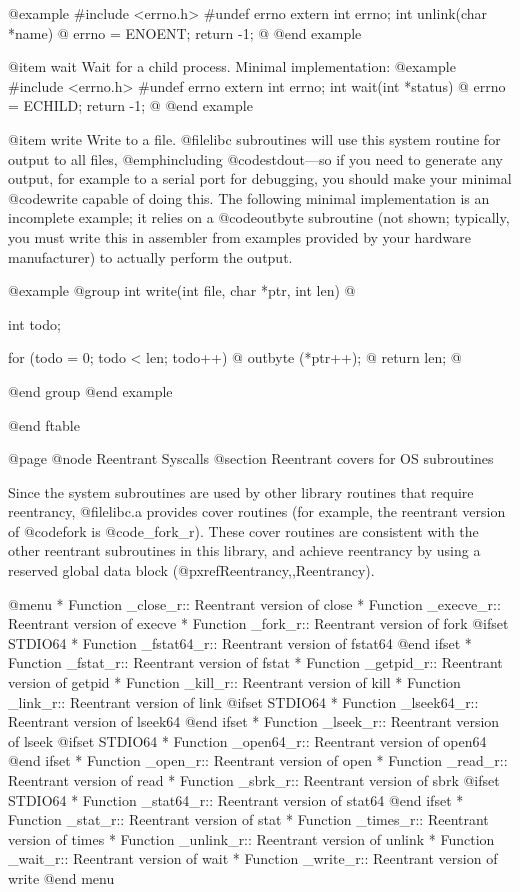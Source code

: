 @example
#include <errno.h>
#undef errno
extern int errno;
int unlink(char *name) @{
  errno = ENOENT;
  return -1; 
@}
@end example

@item wait
Wait for a child process.  Minimal implementation:
@example
#include <errno.h>
#undef errno
extern int errno;
int wait(int *status) @{
  errno = ECHILD;
  return -1;
@}
@end example

@item write
Write to a file.  @file{libc} subroutines will use this
system routine for output to all files, @emph{including}
@code{stdout}---so if you need to generate any output, for example to a
serial port for debugging, you should make your minimal @code{write}
capable of doing this.  The following minimal implementation is an
incomplete example; it relies on a @code{outbyte} subroutine (not
shown; typically, you must write this in assembler from examples
provided by your hardware manufacturer) to actually perform the output.

@example
@group
int write(int file, char *ptr, int len) @{
  int todo;

  for (todo = 0; todo < len; todo++) @{
    outbyte (*ptr++);
  @}
  return len;
@}
@end group
@end example

@end ftable

@page
@node Reentrant Syscalls
@section Reentrant covers for OS subroutines

Since the system subroutines are used by other library routines that
require reentrancy, @file{libc.a} provides cover routines (for example,
the reentrant version of @code{fork} is @code{_fork_r}).  These cover
routines are consistent with the other reentrant subroutines in this
library, and achieve reentrancy by using a reserved global data block
(@pxref{Reentrancy,,Reentrancy}).

@menu
* Function _close_r::	Reentrant version of close
* Function _execve_r::	Reentrant version of execve
* Function _fork_r::	Reentrant version of fork
@ifset STDIO64
* Function _fstat64_r::	Reentrant version of fstat64
@end ifset
* Function _fstat_r::	Reentrant version of fstat
* Function _getpid_r::	Reentrant version of getpid
* Function _kill_r::	Reentrant version of kill
* Function _link_r::	Reentrant version of link
@ifset STDIO64
* Function _lseek64_r::	Reentrant version of lseek64
@end ifset
* Function _lseek_r::	Reentrant version of lseek
@ifset STDIO64
* Function _open64_r::	Reentrant version of open64
@end ifset
* Function _open_r::	Reentrant version of open
* Function _read_r::	Reentrant version of read
* Function _sbrk_r::	Reentrant version of sbrk
@ifset STDIO64
* Function _stat64_r::	Reentrant version of stat64
@end ifset
* Function _stat_r::	Reentrant version of stat
* Function _times_r::	Reentrant version of times
* Function _unlink_r::	Reentrant version of unlink
* Function _wait_r::	Reentrant version of wait
* Function _write_r::	Reentrant version of write
@end menu


